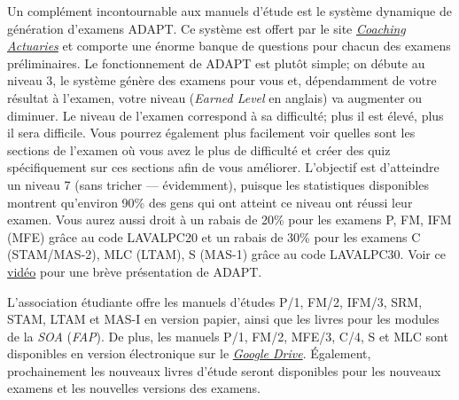 Un complément incontournable aux manuels d'étude est le système dynamique de génération d'examens ADAPT. Ce système est offert par le site \href{https://www.coachingactuaries.com/}{\emph{Coaching Actuaries}} et comporte une énorme banque de questions pour chacun des examens préliminaires. Le fonctionnement de ADAPT est plutôt simple; on débute au niveau 3, le système génère des examens pour vous et, dépendamment de votre résultat à l'examen, votre niveau (\emph{Earned Level} en anglais) va augmenter ou diminuer. Le niveau de l'examen correspond à sa difficulté; plus il est élevé, plus il sera difficile. Vous pourrez également plus facilement voir quelles sont les sections de l'examen où vous avez le plus de difficulté et créer des quiz spécifiquement sur ces sections afin de vous améliorer. L'objectif est d'atteindre un niveau 7 (sans tricher --- évidemment), puisque les statistiques disponibles montrent qu'environ 90\% des gens qui ont atteint ce niveau ont réussi leur examen. Vous aurez aussi droit à un rabais de 20\% pour les examens P, FM, IFM (MFE) grâce au code LAVALPC20 et un rabais de 30\% pour les examens C (STAM/MAS-2), MLC (LTAM), S (MAS-1) grâce au code LAVALPC30. Voir ce \href{https://www.youtube.com/watch?v=ZBxLa2J5jhs}{vidéo} pour une brève présentation de ADAPT. \vspace{\baselineskip}

L'association étudiante offre les manuels d'études P/1, FM/2, IFM/3, SRM, STAM, LTAM et MAS-I en version papier, ainsi que les livres pour les modules de la \textit{SOA} (\textit{FAP}). De plus, les manuels P/1, FM/2, MFE/3, C/4, S et MLC sont disponibles en version électronique sur le \href{https://drive.google.com/open?id=0B6kXivc6X9LISE1ydE41UnY3UDQ}{\textit{Google Drive}}. Également, prochainement les nouveaux livres d'étude seront disponibles pour les nouveaux examens et les nouvelles versions des examens.
\newpage